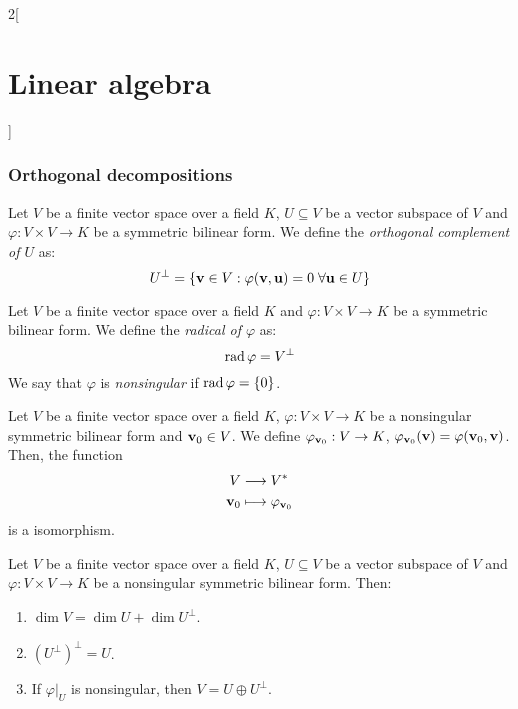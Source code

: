 \documentclass[../../../main.tex]{subfiles}
\begin{document}
\begin{multicols}{2}[\section{Linear algebra}]
  \subsubsection{Orthogonal decompositions}
  \begin{definition}\label{ALG-singular}
    Let $V$ be a finite vector space over a field $K$, $U\subseteq V$ be a vector subspace of $V$ and $\varphi:V\times V\rightarrow K$ be a symmetric bilinear form. We define the \textit{orthogonal complement of $U$} as: $$U^\perp=\{\boldsymbol{\mathrm{v}}\in V:\varphi(\boldsymbol{\mathrm{v}},\boldsymbol{\mathrm{u}})=0\;\forall\boldsymbol{\mathrm{u}}\in U\}$$
  \end{definition}
  \begin{definition}
    Let $V$ be a finite vector space over a field $K$ and $\varphi:V\times V\rightarrow K$ be a symmetric bilinear form. We define the \textit{radical of $\varphi$} as: $$\operatorname{rad}\varphi=V^\perp$$ We say that $\varphi$ is \textit{nonsingular} if $\operatorname{rad}\varphi=\{0\}$.
  \end{definition}
  \begin{definition}
    Let $V$ be a finite vector space over a field $K$, $\varphi:V\times V\rightarrow K$ be a nonsingular symmetric bilinear form and $\boldsymbol{\mathrm{v}}_0\in V$. We define $\varphi_{\boldsymbol{\mathrm{v}}_0}:V\rightarrow K$, $\varphi_{\boldsymbol{\mathrm{v}}_0}(\boldsymbol{\mathrm{v}})=\varphi(\boldsymbol{\mathrm{v}}_0,\boldsymbol{\mathrm{v}})$. Then, the function
    \begin{align*}
      V                    & \longrightarrow V^*                       \\
      \boldsymbol{\mathrm{v}}_0 & \longmapsto\varphi_{\boldsymbol{\mathrm{v}}_0}
    \end{align*} is a isomorphism.
  \end{definition}
  \begin{definition}
    Let $V$ be a finite vector space over a field $K$, $U\subseteq V$ be a vector subspace of $V$ and $\varphi:V\times V\rightarrow K$ be a nonsingular symmetric bilinear form. Then:
    \begin{enumerate}
      \item $\dim V=\dim U+\dim U^\perp$.
      \item ${(U^\perp)}^\perp=U$.
      \item If $\varphi|_U$ is nonsingular, then $V=U\oplus U^\perp$.
    \end{enumerate}
  \end{definition}
  \begin{definition}

\end{definition}
\end{multicols}
\end{document}
